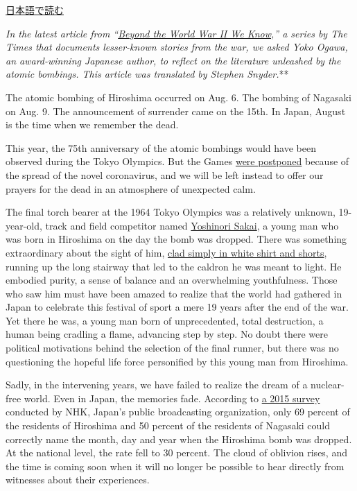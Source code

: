 \href{https://www.nytimes.com/ja/2020/08/06/magazine/atomic-bombings-japan-books-hiroshima-nagasaki.html}{日本語で読む}

\emph{\emph{\emph{In the latest article from
``}\href{https://www.nytimes.com/spotlight/beyond-wwii}{\emph{Beyond the
World War II We Know}}},'' a series by The Times that documents
lesser-known stories from the war, we asked Yoko Ogawa, an award-winning
Japanese author, to reflect on the literature unleashed by the atomic
bombings. This article was translated by Stephen Snyder.}**

The atomic bombing of Hiroshima occurred on Aug. 6. The bombing of
Nagasaki on Aug. 9. The announcement of surrender came on the 15th. In
Japan, August is the time when we remember the dead.

This year, the 75th anniversary of the atomic bombings would have been
observed during the Tokyo Olympics. But the Games
\href{https://www.nytimes.com/2020/03/24/sports/olympics/coronavirus-summer-olympics-postponed.html}{were
postponed} because of the spread of the novel coronavirus, and we will
be left instead to offer our prayers for the dead in an atmosphere of
unexpected calm.

The final torch bearer at the 1964 Tokyo Olympics was a relatively
unknown, 19-year-old, track and field competitor named
\href{https://www.japantimes.co.jp/news/2014/09/10/national/torch-runner-from-1964-tokyo-olympics-dies-at-69/}{Yoshinori
Sakai}, a young man who was born in Hiroshima on the day the bomb was
dropped. There was something extraordinary about the sight of him,
\href{https://www.worldathletics.org/news/iaaf-news/death-yoshinori-sakai-1964-olympic-games}{clad
simply in white shirt and shorts}, running up the long stairway that led
to the caldron he was meant to light. He embodied purity, a sense of
balance and an overwhelming youthfulness. Those who saw him must have
been amazed to realize that the world had gathered in Japan to celebrate
this festival of sport a mere 19 years after the end of the war. Yet
there he was, a young man born of unprecedented, total destruction, a
human being cradling a flame, advancing step by step. No doubt there
were political motivations behind the selection of the final runner, but
there was no questioning the hopeful life force personified by this
young man from Hiroshima.

Sadly, in the intervening years, we have failed to realize the dream of
a nuclear-free world. Even in Japan, the memories fade. According to
\href{https://www.nhk.or.jp/bunken/english/reports/summary/201511/01.html}{a
2015 survey} conducted by NHK, Japan's public broadcasting organization,
only 69 percent of the residents of Hiroshima and 50 percent of the
residents of Nagasaki could correctly name the month, day and year when
the Hiroshima bomb was dropped. At the national level, the rate fell to
30 percent. The cloud of oblivion rises, and the time is coming soon
when it will no longer be possible to hear directly from witnesses about
their experiences.

